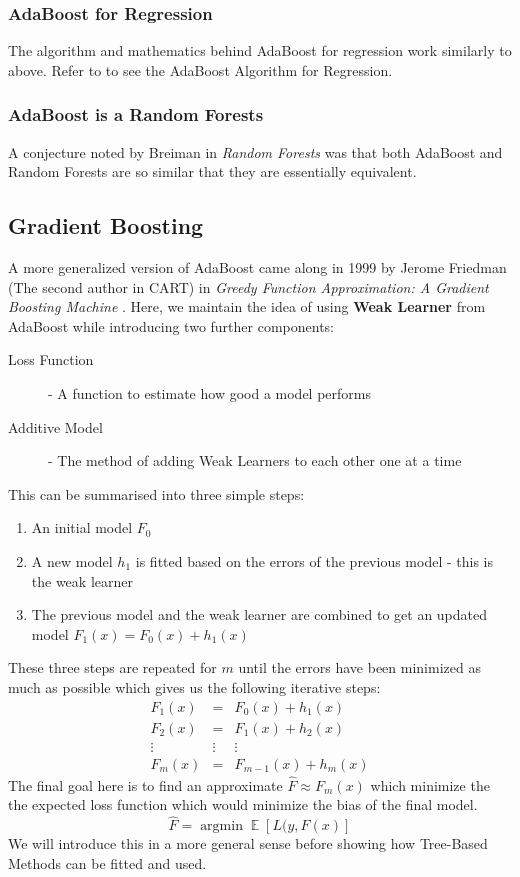 \documentclass[11pt,a4paper]{report}
\DeclareMathOperator*{\argminB}{argmin}
\DeclareMathOperator{\EX}{\mathbb{E}}
\begin{document}
\subsubsection{AdaBoost for Regression}
The algorithm and mathematics behind AdaBoost for regression work similarly to above. Refer to \cite{adaboost} to see the AdaBoost Algorithm for Regression.

\subsubsection{AdaBoost is a Random Forests}
A conjecture noted by Breiman in \textit{Random Forests} \cite{randomforest} was that both AdaBoost and Random Forests are so similar that they are essentially equivalent.

\subsection{Gradient Boosting}
A more generalized version of AdaBoost came along in 1999 by Jerome Friedman (The second author in CART) in \textit{Greedy Function Approximation: A Gradient Boosting Machine} \cite{gbm}.
Here, we maintain the idea of using \textbf{Weak Learner} from AdaBoost while introducing two further components:
\begin{description}
    \item[Loss Function] - A function to estimate how good a model performs
    
    \item[Additive Model] - The method of adding Weak Learners to each other one at a time
\end{description}
This can be summarised into three simple steps:
\begin{enumerate}
    \item An initial model $F_0$
    
    \item A new model $h_1$ is fitted based on the errors of the previous model - this is the weak learner
    
    \item The previous model and the weak learner are combined to get an updated model $F_1 (x) = F_0 (x) + h_1 (x)$
\end{enumerate}
These three steps are repeated for $m$ until the errors have been minimized as much as possible which gives us the following iterative steps:
\[
\begin{array}{ccc}
    F_1 (x) & = & F_0 (x) + h_1 (x) \\
    F_2 (x) & = & F_1 (x) + h_2 (x) \\
    \vdots & \vdots & \vdots \\
    F_m (x) & = & F_{m-1} (x) + h_m (x)
\end{array}
\]
The final goal here is to find an approximate $\hat{F} \approx F_m (x)$ which minimize the the expected loss function which would minimize the bias of the final model.
\[
\hat{F} = \argminB \EX [L(y,F(x)]
\]
We will introduce this in a more general sense before showing how Tree-Based Methods can be fitted and used.
\end{document}
